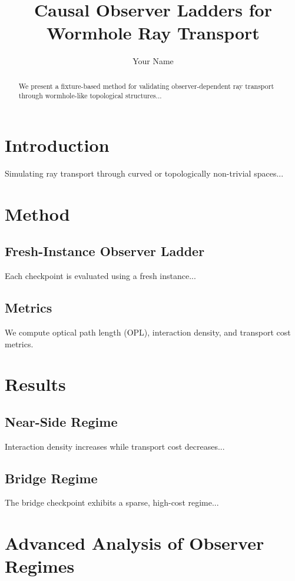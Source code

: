 \documentclass[11pt]{article}
\title{Causal Observer Ladders for Wormhole Ray Transport}
\author{Your Name}
\date{}
\begin{document}
\maketitle

\begin{abstract}
We present a fixture-based method for validating observer-dependent ray transport through wormhole-like topological structures...
\end{abstract}

\section{Introduction}
Simulating ray transport through curved or topologically non-trivial spaces...

\section{Method}

\subsection{Fresh-Instance Observer Ladder}
Each checkpoint is evaluated using a fresh instance...

\subsection{Metrics}
We compute optical path length (OPL), interaction density, and transport cost metrics.

\section{Results}

\subsection{Near-Side Regime}
Interaction density increases while transport cost decreases...

\subsection{Bridge Regime}
The bridge checkpoint exhibits a sparse, high-cost regime...

\section{Advanced Analysis of Observer Regimes}
\end{document}
